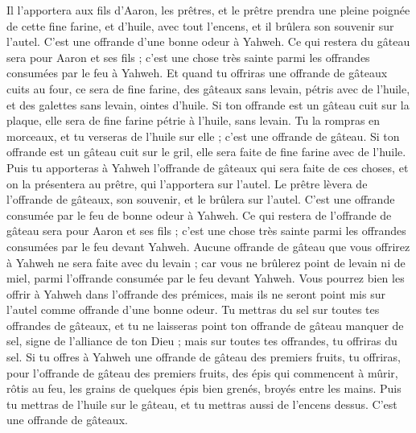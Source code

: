 \begin{multicols}{2}
Il l'apportera aux fils d'Aaron, les prêtres, et le prêtre prendra une pleine poignée de cette fine farine, et d'huile, avec tout l'encens, et il brûlera son souvenir sur l'autel. C'est une offrande d'une bonne odeur à Yahweh.
Ce qui restera du gâteau sera pour Aaron et ses fils ; c'est une chose très sainte parmi les offrandes consumées par le feu à Yahweh.
Et quand tu offriras une offrande de gâteaux cuits au four, ce sera de fine farine, des gâteaux sans levain, pétris avec de l'huile, et des galettes sans levain, ointes d'huile.
Si ton offrande est un gâteau cuit sur la plaque, elle sera de fine farine pétrie à l'huile, sans levain.
Tu la rompras en morceaux, et tu verseras de l'huile sur elle ; c'est une offrande de gâteau.
Si ton offrande est un gâteau cuit sur le gril, elle sera faite de fine farine avec de l'huile.
Puis tu apporteras à Yahweh l'offrande de gâteaux qui sera faite de ces choses, et on la présentera au prêtre, qui l'apportera sur l'autel.
Le prêtre lèvera de l'offrande de gâteaux, son souvenir, et le brûlera sur l'autel. C'est une offrande consumée par le feu de bonne odeur à Yahweh.
Ce qui restera de l'offrande de gâteau sera pour Aaron et ses fils ; c'est une chose très sainte parmi les offrandes consumées par le feu devant Yahweh.
Aucune offrande de gâteau que vous offrirez à Yahweh ne sera faite avec du levain ; car vous ne brûlerez point de levain ni de miel, parmi l'offrande consumée par le feu devant Yahweh.
Vous pourrez bien les offrir à Yahweh dans l'offrande des prémices, mais ils ne seront point mis sur l'autel comme offrande d'une bonne odeur.
Tu mettras du sel sur toutes tes offrandes de gâteaux, et tu ne laisseras point ton offrande de gâteau manquer de sel, signe de l'alliance de ton Dieu ; mais sur toutes tes offrandes, tu offriras du sel.
Si tu offres à Yahweh une offrande de gâteau des premiers fruits, tu offriras, pour l'offrande de gâteau des premiers fruits, des épis qui commencent à mûrir, rôtis au feu, les grains de quelques épis bien grenés, broyés entre les mains.
Puis tu mettras de l'huile sur le gâteau, et tu mettras aussi de l'encens dessus. C'est une offrande de gâteaux.

\end{multicols}
